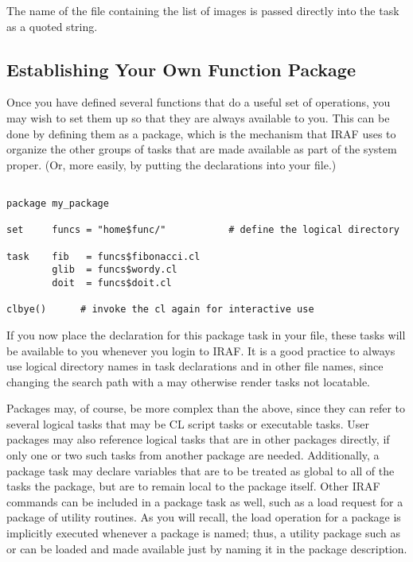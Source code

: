 \noindent
The name of the file containing the list of images 
is passed directly into the task as a quoted string.  

\subsection{Establishing Your Own Function Package}

Once you have defined several functions that do a useful set of operations,
you may wish to set them up so that they are always available to you.
This can be done by defining them as a package, which is the mechanism 
that IRAF uses to organize the other groups of tasks that are made 
available as part of the system proper.  (Or, more easily, by putting
the  declarations into your  file.)

\newpage
\begin{verbatim}

package my_package

set 	funcs = "home$func/"           # define the logical directory

task    fib   = funcs$fibonacci.cl
        glib  = funcs$wordy.cl
        doit  = funcs$doit.cl

clbye()      # invoke the cl again for interactive use

\end{verbatim}

\noindent
If you now place the declaration for this package task in your
 file, these tasks will be available to you whenever
you login to IRAF.  It is a good practice to always use logical directory
names in task declarations and in other file names, since changing the
search path with a  may otherwise render tasks not
locatable.

Packages may, of course, be more complex than the above, since they can
refer to several logical tasks that may be CL script tasks or executable
tasks.  User packages may also reference logical tasks that are in other
packages directly, if only one or two such tasks from another package are 
needed.  Additionally, a package task may declare variables
that are to be treated as global to all of the tasks  
the package, but are to remain local to the package itself.  Other IRAF 
commands can be included in a package task as well, such as a load request
for a package of utility routines.  As you will recall, the
load operation for a package is implicitly executed whenever a package
is named; thus, a utility package such as  or 
can be loaded and made available just by naming it in the package description.

